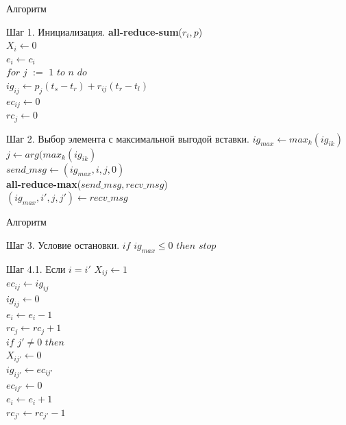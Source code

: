 \documentclass{beamer}
\begin{document}
\begin{frame}[fragile]{Алгоритм}
	\begin{block}{Шаг 1. Инициализация.}
		\textbf{all-reduce-sum}($r_i, p$)\\
		$X_i \gets 0$\\
		$e_i \gets c_i$\\
		$for$ $j$ $:=$ $1$ $to$ $n$ $do$\\
		\qquad$ig_{ij} \gets p_j (t_s - t_r) + r_{ij} (t_r - t_l)$\\
		\qquad$ec_{ij} \gets 0$\\
		\qquad$rc_j \gets 0$
	\end{block}

	\begin{block}{Шаг 2. Выбор элемента с максимальной выгодой вставки.}
		$ig_{max} \gets max_k (ig_{ik})$\\
		$j \gets arg(max_k(ig_{ik})$\\
		$send\_msg \gets (ig_{max}, i, j, 0)$\\ 
		\textbf{all-reduce-max}($send\_msg, recv\_msg$)\\
		$(ig_{max}, i', j, j') \gets recv\_msg$		
	\end{block} 
\end{frame}

\begin{frame}[fragile]{Алгоритм}
	\begin{block}{Шаг 3. Условие остановки.}
		$if$ $ig_{max} \le 0$ $then$ $stop$
	\end{block}

	\begin{block}{Шаг 4.1. Если $i = i'$}
		$X_{ij} \gets 1$\\
		$ec_{ij} \gets ig_{ij}$\\
		$ig_{ij} \gets 0$\\
		$e_i \gets e_i - 1$\\
		$rc_j \gets rc_j + 1$\\
		$if$ $j' \neq 0$ $then$\\
		\qquad$X_{ij'} \gets 0$\\
		\qquad$ig_{ij'} \gets ec_{ij'}$\\
		\qquad$ec_{ij'} \gets 0$\\
		\qquad$e_i \gets e_i + 1$\\
		\qquad$rc_{j'} \gets rc_{j'} - 1$
	\end{block}
\end{frame}
\end{document}
